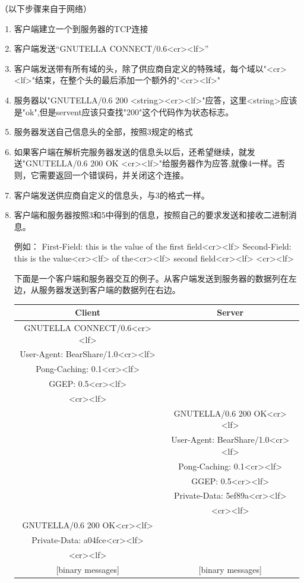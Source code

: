 \documentclass{ctexart}
\begin{document}
（以下步骤来自于网络）
\begin{enumerate}
	\item 客户端建立一个到服务器的TCP连接
	\item 客户端发送“GNUTELLA CONNECT/0.6<cr><lf>”
	\item 客户端发送带有所有域的头，除了供应商自定义的特殊域，每个域以"<cr><lf>"结束，在整个头的最后添加一个额外的"<cr><lf>"
	\item 服务器以"GNUTELLA/0.6 200 <string><cr><lf>"应答，这里<string>应该是"ok",但是servent应该只查找"200"这个代码作为状态标志。
	\item 服务器发送自己信息头的全部，按照3规定的格式
	\item 如果客户端在解析完服务器发送的信息头以后，还希望继续，就发送"GNUTELLA/0.6 200 OK <cr><lf>"给服务器作为应答,就像4一样。否则，它需要返回一个错误码，并关闭这个连接。
	\item 客户端发送供应商自定义的信息头，与3的格式一样。
	\item 客户端和服务器按照3和5中得到的信息，按照自己的要求发送和接收二进制消息。

	例如：
	First-Field: this is the value of the first field<cr><lf>
	Second-Field: this is the value<cr><lf>
	of the<cr><lf>
	second field<cr><lf>
	<cr><lf>

	下面是一个客户端和服务器交互的例子。从客户端发送到服务器的数据列在左边，从服务器发送到客户端的数据列在右边。

	\begin{tabular}{cc}
		\hline
		Client                          &Server\\\hline
		GNUTELLA CONNECT/0.6<cr><lf>& \\
		User-Agent: BearShare/1.0<cr><lf>& \\
		Pong-Caching: 0.1<cr><lf>& \\
		GGEP: 0.5<cr><lf>& \\
		<cr><lf>& \\
		&GNUTELLA/0.6 200 OK<cr><lf> \\
		&User-Agent: BearShare/1.0<cr><lf> \\
		&Pong-Caching: 0.1<cr><lf> \\
		&GGEP: 0.5<cr><lf> \\
		&Private-Data: 5ef89a<cr><lf> \\
		&<cr><lf> \\
		GNUTELLA/0.6 200 OK<cr><lf>& \\
		Private-Data: a04fce<cr><lf>& \\
		<cr><lf>& \\
		{[binary messages]}&{[binary messages]} \\ 
	\end{tabular}
\end{enumerate}
\end{document}
